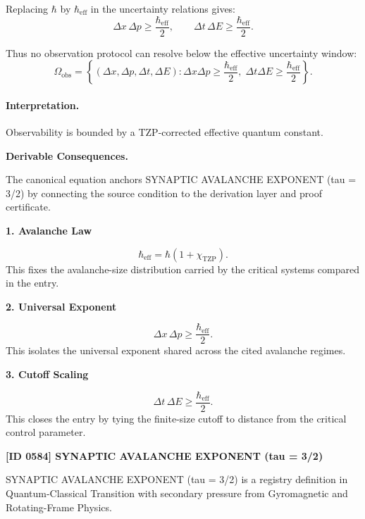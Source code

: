 Replacing $\hbar$ by $\hbar_{\mathrm{eff}}$ in the uncertainty relations gives:
\begin{equation}
\Delta x\,\Delta p
\geq
\frac{\hbar_{\mathrm{eff}}}{2},
\qquad
\Delta t\,\Delta E
\geq
\frac{\hbar_{\mathrm{eff}}}{2}.
\end{equation}

Thus no observation protocol can resolve below the effective uncertainty window:
\begin{equation}
\boxed{
\Omega_{\mathrm{obs}}
=
\left\{
(\Delta x,\Delta p,\Delta t,\Delta E):
\Delta x\Delta p\geq \frac{\hbar_{\mathrm{eff}}}{2},
\;
\Delta t\Delta E\geq \frac{\hbar_{\mathrm{eff}}}{2}
\right\}.
}
\end{equation}

\paragraph{Interpretation.}
Observability is bounded by a TZP-corrected effective quantum constant.

\par\vspace{0.35em}
\noindent\textbf{Derivable Consequences.}\quad
\begingroup
\footnotesize
\raggedright
The canonical equation anchors SYNAPTIC AVALANCHE EXPONENT (tau = 3/2) by connecting the source condition to the derivation layer and proof certificate.
\par\endgroup

\noindent\textbf{1. Avalanche Law}\par
\[
\hbar_{\mathrm{eff}} = \hbar(1+\chi_{\mathrm{TZP}}).
\]
\noindent This fixes the avalanche-size distribution carried by the critical systems compared in the entry.\par
\noindent\textbf{2. Universal Exponent}\par
\[
\Delta x\,\Delta p \geq \frac{\hbar_{\mathrm{eff}}}{2}.
\]
\noindent This isolates the universal exponent shared across the cited avalanche regimes.\par
\noindent\textbf{3. Cutoff Scaling}\par
\[
\Delta t\,\Delta E \geq \frac{\hbar_{\mathrm{eff}}}{2}.
\]
\noindent This closes the entry by tying the finite-size cutoff to distance from the critical control parameter.\par

\clearpage
\noindent\textbf{[ID 0584] SYNAPTIC AVALANCHE EXPONENT (tau = 3/2)}\par
\vspace{0.35em}
\begingroup\small
{}
SYNAPTIC AVALANCHE EXPONENT (tau = 3/2) is a registry definition in Quantum-Classical Transition with secondary pressure from Gyromagnetic and Rotating-Frame Physics.

